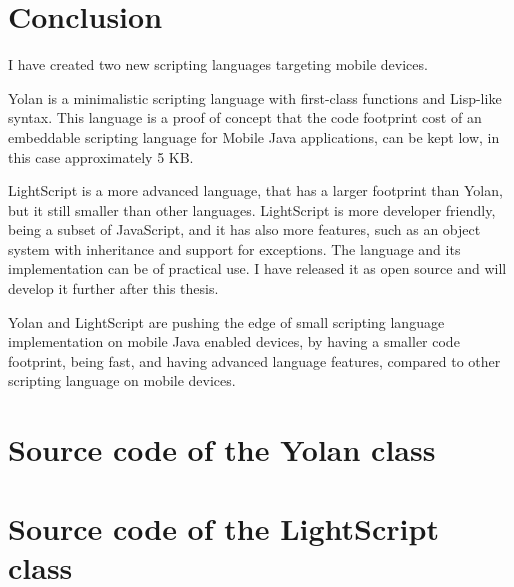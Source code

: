 \documentclass[11pt]{report}
\begin{document}
\chapter{Conclusion}
\label{conclusion}
I have created two new scripting languages targeting mobile devices.

Yolan is a minimalistic scripting language with first-class functions and Lisp-like syntax. This language is a proof of concept that the code footprint cost of an embeddable scripting language for Mobile Java applications, can be kept low, in this case approximately 5 KB.

LightScript is a more advanced language, that has a larger footprint than Yolan, but it still smaller than other languages. LightScript is more developer friendly, being a subset of JavaScript, and it has also more features, such as an object system with inheritance and support for exceptions.
The language and its implementation can be of practical use. I have released it as open source and will develop it further after this thesis.

Yolan and LightScript are pushing the edge of small scripting language implementation on mobile Java enabled devices, by having a smaller code footprint, being fast, and having advanced language features, compared to other scripting language on mobile devices.


%
%

\newpage
{}



\appendix

%


\chapter{Source code of the Yolan class}


\chapter{Source code of the LightScript class}



\newpage
{}
\end{document}
